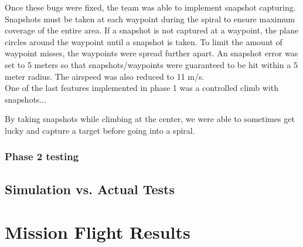 \documentclass[11pt]{article}
\begin{document}
Once these bugs were fixed, the team was able to implement snapshot capturing. Snapshots must be taken at each waypoint during the spiral to ensure maximum coverage of the entire area. If a snapshot is not captured at a waypoint, the plane circles around the waypoint until a snapshot is taken. To limit the amount of waypoint misses, the waypoints were spread further apart. An snapshot error was set to 5 meters so that snapshots/waypoints were guaranteed to be hit within a 5 meter radius. The airspeed was also reduced to 11 m/s.\\

One of the last features implemented in phase 1 was a controlled climb with snapshots...


By taking snapshots while climbing at the center, we were able to sometimes get lucky and capture a target before going into a spiral.

\subsubsection{Phase 2 testing}

\subsection{Simulation vs. Actual Tests}
\label{simvsact}



\section{Mission Flight Results}
\label{MissionFlightResults}
\end{document}
